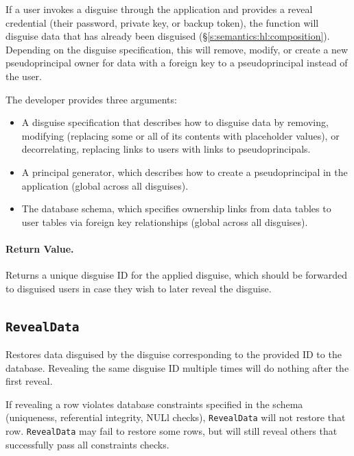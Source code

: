     If a user invokes a disguise through the application and provides a reveal
    credential (their password, private key, or backup token), the function will
    disguise data that has already been disguised
    (\S\ref{s:semantics:hl:composition}).
    Depending on the disguise specification, this will remove, modify, or create
    a new pseudoprincipal owner for data with a foreign key to a pseudoprincipal
    instead of the user.

    The developer provides three arguments:
    \begin{itemize}[nosep]
    \item A disguise specification that describes how to disguise data by
    removing, modifying (replacing some or all of its contents with placeholder
    values), or decorrelating, replacing links to users with links to
    pseudoprincipals.
    
    \item A principal generator, which describes how to create a
    pseudoprincipal in the application (global across all disguises).
    
    \item The database schema, which specifies ownership links from data tables to user
    tables via foreign key relationships (global across all disguises).
    \end{itemize}

    \paragraph{Return Value.} 
    Returns a unique disguise ID for the applied disguise, which should be
    forwarded to disguised users in case they wish to later reveal the
    disguise.

\subsection{\texttt{RevealData}}

    Restores data disguised by the disguise corresponding to the provided ID to
    the database. Revealing the same disguise ID multiple times will do nothing
    after the first reveal.

    If revealing a row violates database constraints specified in the schema
    (\eg uniqueness, referential integrity, NULl checks), \texttt{RevealData}
    will not restore that row.  \texttt{RevealData} may fail to restore some
    rows, but will still reveal others that successfully pass all constraints
    checks.

